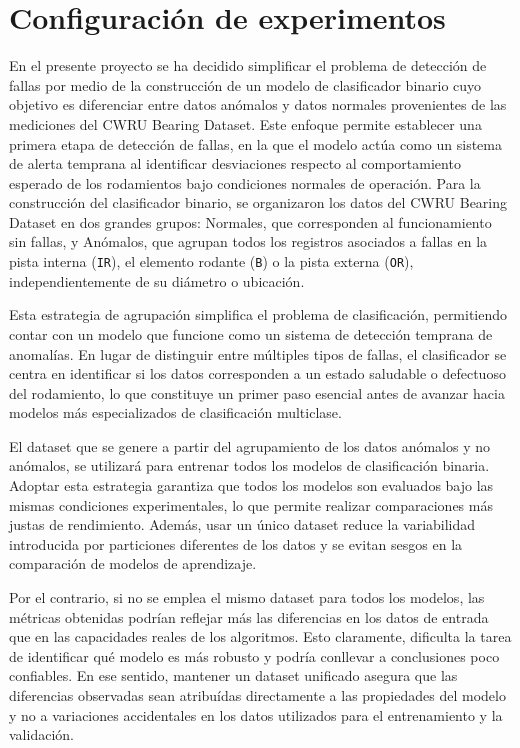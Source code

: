 \documentclass[11pt,a4paper,spanish]{book}
\numberwithin{equation}{chapter}
\numberwithin{figure}{chapter}
\begin{document}
\section{Configuración de experimentos}

 En el presente proyecto se ha decidido simplificar el problema de detección de fallas por medio de la construcción de un modelo de clasificador binario cuyo objetivo es diferenciar entre datos anómalos y datos normales provenientes de las mediciones del CWRU Bearing Dataset. Este enfoque permite establecer una primera etapa de detección de fallas, en la que el modelo actúa como un sistema de alerta temprana al identificar desviaciones respecto al comportamiento esperado de los rodamientos bajo condiciones normales de operación.
Para la construcción del clasificador binario, se organizaron los datos del CWRU Bearing Dataset en dos grandes grupos: Normales, que corresponden al funcionamiento sin fallas, y Anómalos,  que agrupan todos los registros asociados a fallas en la pista interna (\texttt{IR}), el elemento rodante (\texttt{B}) o la pista externa (\texttt{OR}), independientemente de su diámetro o ubicación.


Esta estrategia de agrupación simplifica el problema de clasificación, permitiendo contar con un modelo que funcione como un sistema de detección temprana de anomalías. En lugar de distinguir entre múltiples tipos de fallas, el clasificador se centra en identificar si los datos corresponden a un estado saludable o defectuoso del rodamiento, lo que constituye un primer paso esencial antes de avanzar hacia modelos más especializados de clasificación multiclase.


El dataset que se genere a partir del agrupamiento de los datos anómalos y no anómalos, se utilizará para entrenar todos los modelos de clasificación binaria. Adoptar esta estrategia garantiza que todos los modelos son evaluados bajo las mismas condiciones experimentales, lo que permite realizar comparaciones más justas de rendimiento. Además, usar un único dataset reduce la variabilidad introducida por particiones diferentes de los datos y se evitan sesgos en la comparación de modelos de aprendizaje.


Por el contrario, si no se emplea el mismo dataset para todos los modelos, las métricas obtenidas podrían reflejar más las diferencias en los datos de entrada que en las capacidades reales de los algoritmos. Esto claramente, dificulta la tarea de identificar qué modelo es más robusto y podría conllevar a conclusiones poco confiables. En ese sentido, mantener un dataset unificado asegura que las diferencias observadas sean atribuídas directamente a las propiedades del modelo y no a variaciones accidentales en los datos utilizados para el entrenamiento y la validación.
\end{document}
